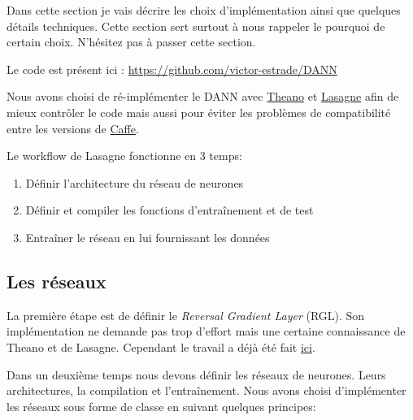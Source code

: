 
Dans cette section je vais décrire les choix d'implémentation ainsi que 
quelques détails techniques. Cette section sert surtout à nous rappeler
le pourquoi de certain choix. N'hésitez pas à passer cette section.

Le code est présent ici : \url{https://github.com/victor-estrade/DANN}

Nous avons choisi de ré-implémenter le DANN avec 
\href{http://deeplearning.net/software/theano/}{Theano}
et \href{http://lasagne.readthedocs.org/en/latest/index.html}{Lasagne}
afin de mieux contrôler le code mais aussi pour éviter les problèmes de 
compatibilité entre les versions de \href{http://caffe.berkeleyvision.org/}{Caffe}.

Le workflow de Lasagne fonctionne en 3 temps:
\begin{enumerate}
	\item Définir l'architecture du réseau de neurones
	\item Définir et compiler les fonctions d'entraînement et de test
	\item Entraîner le réseau en lui fournissant les données
\end{enumerate}

\subsection{Les réseaux} %
\label{sub:les_reseaux}

La première étape est de définir le \emph{Reversal Gradient Layer} (RGL).
Son implémentation ne demande pas trop d'effort mais une certaine connaissance
de Theano et de Lasagne. Cependant le travail a déjà été fait
\href{http://stackoverflow.com/questions/33879736/can-i-selectively-invert-theano-gradients-during-backpropagation}{ici}.

Dans un deuxième temps nous devons définir les réseaux de neurones. Leurs
architectures, la compilation et l'entraînement. Nous avons choisi 
d'implémenter les réseaux sous forme de classe en suivant quelques principes:

